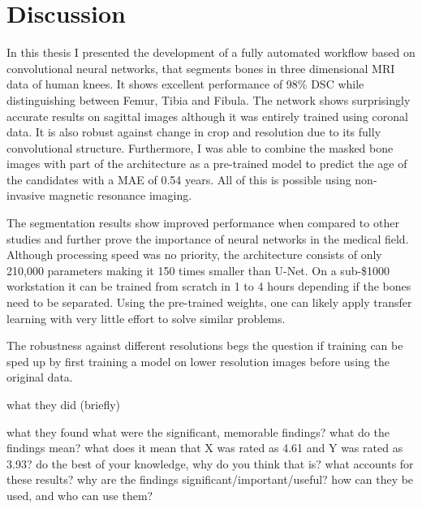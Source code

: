 \section{Discussion}

In this thesis I presented the development of a fully automated workflow based on convolutional neural networks, that segments bones in three dimensional MRI data of human knees. It shows excellent performance of 98\% DSC while distinguishing between Femur, Tibia and Fibula. The network shows surprisingly accurate results on sagittal images although it was entirely trained using coronal data. It is also robust against change in crop and resolution due to its fully convolutional structure. Furthermore, I was able to combine the masked bone images with part of the architecture as a pre-trained model to predict the age of the candidates with a MAE of 0.54 years. All of this is possible using non-invasive magnetic resonance imaging.

The segmentation results show improved performance when compared to other studies and further prove the importance of neural networks in the medical field. Although processing speed was no priority, the architecture consists of only 210,000 parameters making it 150 times smaller than U-Net. On a sub-\$1000 workstation it can be trained from scratch in 1 to 4 hours depending if the bones need to be separated. Using the pre-trained weights, one can likely apply transfer learning with very little effort to solve similar problems.

The robustness against different resolutions begs the question if training can be sped up by first training a model on lower resolution images before using the original data.


what they did (briefly)

what they found
what were the significant, memorable findings?
what do the findings mean?
what does it mean that X was rated as 4.61 and Y was rated as 3.93?
do the best of your knowledge, why do you think that is? what accounts for these results?
why are the findings significant/important/useful? how can they be used, and who can use them?

\newpage